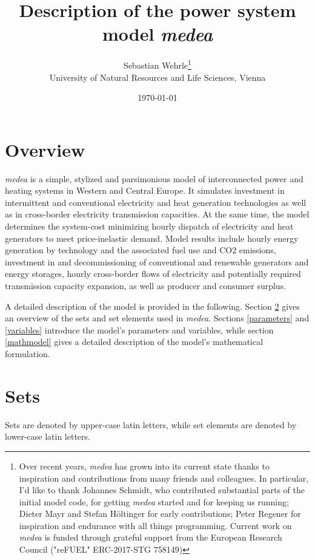 \documentclass[11pt,a4paper]{article}
\title{Description of the power system model \emph{medea}}
\date{\today}
\author{Sebastian Wehrle\thanks{Over recent years, \emph{medea} has grown into its current state thanks to inspiration and contributions from many friends and colleagues. 
In particular, I'd like to thank Johannes Schmidt, who contributed substantial parts of the initial model code, for getting \emph{medea} started and for keeping us running; Dieter Mayr and Stefan Höltinger for early contributions; Peter Regener for inspiration and endurance with all things programming. Current work on \emph{medea} is funded through grateful support from the European Research Council ("reFUEL" ERC-2017-STG 758149)} \\University of Natural Resources and Life Sciences, Vienna}
\begin{document}
\maketitle
\section{Overview}
\emph{medea} is a simple, stylized and parsimonious model of interconnected power and heating systems in Western and Central Europe.
It simulates investment in intermittent and conventional electricity and heat generation technologies as well as in cross-border electricity transmission capacities.
At the same time, the model determines the system-cost minimizing hourly dispatch of electricity and heat generators to meet price-inelastic demand.
Model results include hourly energy generation by technology and the associated fuel use and CO2 emissions, investment in and decommissioning of conventional and renewable generators and energy storages, hourly cross-border flows of electricity and potentially required transmission capacity expansion, as well as producer and consumer surplus.

A detailed description of the model is provided in the following. Section \ref{sets} gives an overview of the sets and set elements used in \emph{medea}. Sections \ref{parameters} and \ref{variables} introduce the model's parameters and variables, while section \ref{mathmodel} gives a detailed description of the model's mathematical formulation.

\newpage

\section{Sets} \label{sets}
Sets are denoted by upper-case latin letters, while set elements are denoted by lower-case latin letters.
\end{document}
